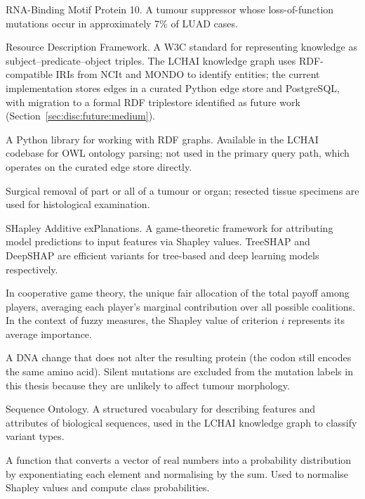 \begin{description}[style=nextline,leftmargin=4cm]
\item[RBM10] RNA-Binding Motif Protein 10.  A tumour suppressor whose loss-of-function mutations occur in approximately 7\% of LUAD cases.


\item[RDF] Resource Description Framework.  A W3C standard for representing knowledge as subject--predicate--object triples.  The LCHAI knowledge graph uses RDF-compatible IRIs from NCIt and MONDO to identify entities; the current implementation stores edges in a curated Python edge store and PostgreSQL, with migration to a formal RDF triplestore identified as future work (Section~\ref{sec:disc:future:medium}).


\item[RDFLib] A Python library for working with RDF graphs.  Available in the LCHAI codebase for OWL ontology parsing; not used in the primary query path, which operates on the curated edge store directly.


\item[Resection] Surgical removal of part or all of a tumour or organ; resected tissue specimens are used for histological examination.


\item[SHAP] SHapley Additive exPlanations.  A game-theoretic framework for attributing model predictions to input features via Shapley values.  TreeSHAP and DeepSHAP are efficient variants for tree-based and deep learning models respectively.


\item[Shapley value] In cooperative game theory, the unique fair allocation of the total payoff among players, averaging each player's marginal contribution over all possible coalitions.  In the context of fuzzy measures, the Shapley value of criterion $i$ represents its average importance.


\item[Silent (synonymous) mutation] A DNA change that does not alter the resulting protein (the codon still encodes the same amino acid).  Silent mutations are excluded from the mutation labels in this thesis because they are unlikely to affect tumour morphology.


\item[SO] Sequence Ontology.  A structured vocabulary for describing features and attributes of biological sequences, used in the LCHAI knowledge graph to classify variant types.


\item[Softmax] A function that converts a vector of real numbers into a probability distribution by exponentiating each element and normalising by the sum.  Used to normalise Shapley values and compute class probabilities.



\end{description}
